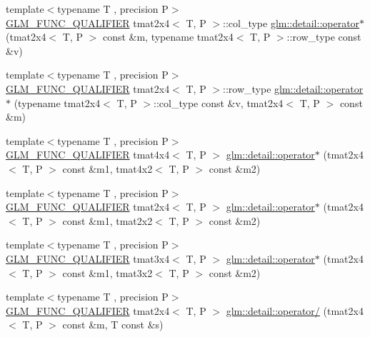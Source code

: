 \begin{DoxyCompactItemize}
\item 
{\footnotesize template$<$typename T , precision P$>$ }\\\hyperlink{setup_8hpp_a33fdea6f91c5f834105f7415e2a64407}{G\+L\+M\+\_\+\+F\+U\+N\+C\+\_\+\+Q\+U\+A\+L\+I\+F\+I\+ER} tmat2x4$<$ T, P $>$\+::col\+\_\+type \hyperlink{namespaceglm_1_1detail_af88c779d26c345bb2fc54c7cefb45ae8}{glm\+::detail\+::operator$\ast$} (tmat2x4$<$ T, P $>$ const \&m, typename tmat2x4$<$ T, P $>$\+::row\+\_\+type const \&v)
\item 
{\footnotesize template$<$typename T , precision P$>$ }\\\hyperlink{setup_8hpp_a33fdea6f91c5f834105f7415e2a64407}{G\+L\+M\+\_\+\+F\+U\+N\+C\+\_\+\+Q\+U\+A\+L\+I\+F\+I\+ER} tmat2x4$<$ T, P $>$\+::row\+\_\+type \hyperlink{namespaceglm_1_1detail_ad1e6fd80657d87f24e73c83e283b4d47}{glm\+::detail\+::operator$\ast$} (typename tmat2x4$<$ T, P $>$\+::col\+\_\+type const \&v, tmat2x4$<$ T, P $>$ const \&m)
\item 
{\footnotesize template$<$typename T , precision P$>$ }\\\hyperlink{setup_8hpp_a33fdea6f91c5f834105f7415e2a64407}{G\+L\+M\+\_\+\+F\+U\+N\+C\+\_\+\+Q\+U\+A\+L\+I\+F\+I\+ER} tmat4x4$<$ T, P $>$ \hyperlink{namespaceglm_1_1detail_a1bf1097e57f02bd840a6a20ebc9d5a10}{glm\+::detail\+::operator$\ast$} (tmat2x4$<$ T, P $>$ const \&m1, tmat4x2$<$ T, P $>$ const \&m2)
\item 
{\footnotesize template$<$typename T , precision P$>$ }\\\hyperlink{setup_8hpp_a33fdea6f91c5f834105f7415e2a64407}{G\+L\+M\+\_\+\+F\+U\+N\+C\+\_\+\+Q\+U\+A\+L\+I\+F\+I\+ER} tmat2x4$<$ T, P $>$ \hyperlink{namespaceglm_1_1detail_ad0260e79f22df11163c5db185f8561c5}{glm\+::detail\+::operator$\ast$} (tmat2x4$<$ T, P $>$ const \&m1, tmat2x2$<$ T, P $>$ const \&m2)
\item 
{\footnotesize template$<$typename T , precision P$>$ }\\\hyperlink{setup_8hpp_a33fdea6f91c5f834105f7415e2a64407}{G\+L\+M\+\_\+\+F\+U\+N\+C\+\_\+\+Q\+U\+A\+L\+I\+F\+I\+ER} tmat3x4$<$ T, P $>$ \hyperlink{namespaceglm_1_1detail_a9d77317ff2a8184dcb1a1236eddab2f3}{glm\+::detail\+::operator$\ast$} (tmat2x4$<$ T, P $>$ const \&m1, tmat3x2$<$ T, P $>$ const \&m2)
\item 
{\footnotesize template$<$typename T , precision P$>$ }\\\hyperlink{setup_8hpp_a33fdea6f91c5f834105f7415e2a64407}{G\+L\+M\+\_\+\+F\+U\+N\+C\+\_\+\+Q\+U\+A\+L\+I\+F\+I\+ER} tmat2x4$<$ T, P $>$ \hyperlink{namespaceglm_1_1detail_a623ed9295b7f88dcbfc6a921aaff47e8}{glm\+::detail\+::operator/} (tmat2x4$<$ T, P $>$ const \&m, T const \&s)

\end{DoxyCompactItemize}

